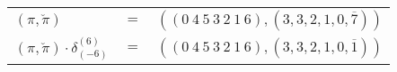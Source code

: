 \begin{example}\label{example:OHVZBOMX}
  \hfill
  \begin{\position}
    \begin{tabular}{lll}
      $(\pi,\breve\pi)$ & $=$ & $(({0}~{4}~{5}~{3}~{2}~{1}~{6}),(3,3,2,1,0,\overline{7}))$ \\
      $(\pi,\breve\pi) \cdot \delta^{(6)}_{(-6)}$ & $=$ & $(({0}~{4}~{5}~{3}~{2}~{1}~{6}),(3,3,2,1,0,\overline{1}))$ \\
    \end{tabular}
  \end{\position}
\end{example}